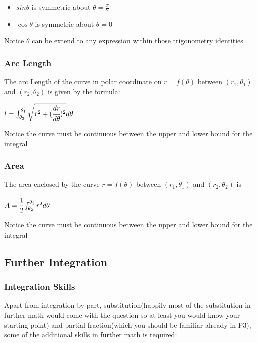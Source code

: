 \documentclass[]{article}
\begin{document}
\begin{itemize}
\item
  \(sin\theta\) is symmetric about \(\theta = \frac{\pi}{2}\)
\item
  \(\cos\theta\) is symmetric about \(\theta = 0\)
\end{itemize}

Notice \(\theta\) can be extend to any expression within those
trigonometry identities

\subsubsection{Arc Length}\label{header-n109}

The arc Length of the curve in polar coordinate on \(r = f(\theta)\)
between \((r_1,\theta_1)\) and \((r_2,\theta_2)\) is given by the
formula:

\(l = \int^{\theta_1}_{\theta_2} \sqrt{r^2 + (\cfrac{dr}{d\theta})^2}d\theta\)

Notice the curve must be continuous between the upper and lower bound
for the integral

\subsubsection{Area}\label{header-n113}

The area enclosed by the curve \(r = f(\theta)\) between
\((r_1,\theta_1)\) and \((r_2,\theta_2)\) is

\(A= \cfrac{1}{2}\int^{\theta_1}_{\theta_2} r^2d\theta\)

Notice the curve must be continuous between the upper and lower bound
for the integral

\subsection{Further Integration}\label{header-n117}

\subsubsection{Integration Skills}\label{header-n118}

Apart from integration by part, substitution(happily most of the
substitution in further math would come with the question so at least
you would know your starting point) and partial fraction(which you
should be familiar already in P3), some of the additional skills in
further math is required:
\end{document}
